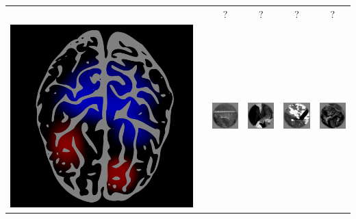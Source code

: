 \documentclass{beamer}
\begin{document}
\begin{frame}
\begin{center}
\begin{tabular}{c|c|cccc}
\hline
 & & ? & ? & ? & ? \\
\includegraphics[scale = 0.035]{brain1.png} & \hspace{0.5in} 
& \includegraphics[scale = .26]{img1.png}
& \includegraphics[scale = .26]{img2.png}
& \includegraphics[scale = .26]{img3.png}
& \includegraphics[scale = .26]{img4.png}\\
\hline
\end{tabular}
\end{center}
\end{frame}
\end{document}
